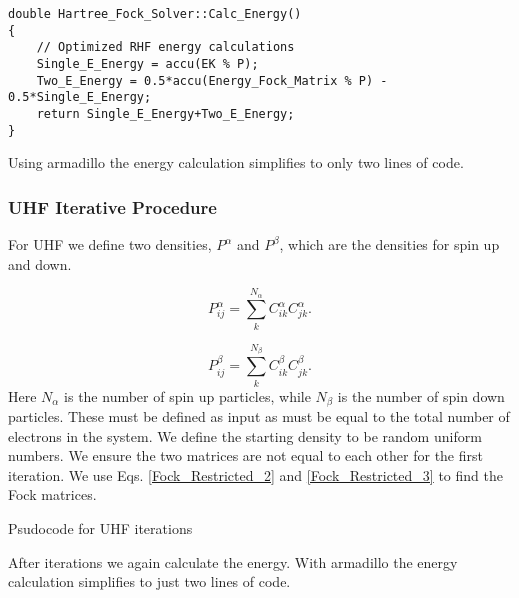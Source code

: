 \begin{lstlisting}
double Hartree_Fock_Solver::Calc_Energy()
{
    // Optimized RHF energy calculations
    Single_E_Energy = accu(EK % P);
    Two_E_Energy = 0.5*accu(Energy_Fock_Matrix % P) - 0.5*Single_E_Energy;
    return Single_E_Energy+Two_E_Energy;
}
\end{lstlisting}
Using armadillo the energy calculation simplifies to only two lines of code. 

\subsubsection{UHF Iterative Procedure}
For UHF we define two densities, $P^{\alpha}$ and $P^{\beta}$, which are the densities for spin up and down. 

\begin{equation}
P^{\alpha}_{ij} = \sum_k^{N_{\alpha}} C^{\alpha}_{ik} C^{\alpha}_{jk} .
\end{equation}

\begin{equation}
P^{\beta}_{ij} = \sum_k^{N_{\beta}} C^{\beta}_{ik} C^{\beta}_{jk} .
\end{equation}
Here $N_{\alpha}$ is the number of spin up particles, while $N_{\beta}$ is the number of spin down particles. These must be defined as input as must be equal to the total number of electrons in the system. We define the starting density to be random uniform numbers. We ensure the two matrices are not equal to each other for the first iteration. We use Eqs. \eqref{Fock_Restricted_2} and \eqref{Fock_Restricted_3} to find the Fock matrices. \\

\begin{algorithm}[H]
 \caption{Psudocode for UHF iterations}
 \label{UHF_ITERATIVE_PROCEDURE}
\end{algorithm}
After iterations we again calculate the energy. With armadillo the energy calculation simplifies to just two lines of code.

